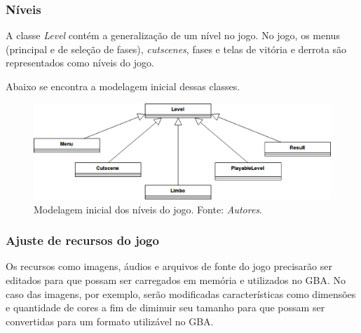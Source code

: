     \subsubsection{Níveis}

      A classe \textit{Level} contém a generalização de um nível no jogo. No jogo, os menus (principal e de seleção de fases), \textit{cutscenes}, fases e telas de vitória e derrota são representados como níveis do jogo.

      Abaixo se encontra a modelagem inicial dessas classes.

      \begin{figure}[H]
        \centering \includegraphics[keepaspectratio=true,scale=0.6]{figuras/class-diagram-2.eps}
        \caption[Modelagem inicial dos níveis do jogo]
          {Modelagem inicial dos níveis do jogo. Fonte: \textit{Autores}.}
        \label{game-object-levels}
      \end{figure}

    \subsubsection{Ajuste de recursos do jogo}

      Os recursos como imagens, áudios e arquivos de fonte do jogo precisarão ser editados para que possam ser carregados em memória e utilizados no GBA. No caso das imagens, por exemplo, serão modificadas características como dimensões e quantidade de cores a fim de diminuir seu tamanho para que possam ser convertidas para um formato utilizável no GBA.
